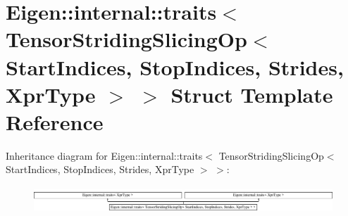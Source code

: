 \hypertarget{struct_eigen_1_1internal_1_1traits_3_01_tensor_striding_slicing_op_3_01_start_indices_00_01_stop9ad1ed36f680305576abbd4a33c38a6e}{}\section{Eigen\+:\+:internal\+:\+:traits$<$ Tensor\+Striding\+Slicing\+Op$<$ Start\+Indices, Stop\+Indices, Strides, Xpr\+Type $>$ $>$ Struct Template Reference}
\label{struct_eigen_1_1internal_1_1traits_3_01_tensor_striding_slicing_op_3_01_start_indices_00_01_stop9ad1ed36f680305576abbd4a33c38a6e}
Inheritance diagram for Eigen\+:\+:internal\+:\+:traits$<$ Tensor\+Striding\+Slicing\+Op$<$ Start\+Indices, Stop\+Indices, Strides, Xpr\+Type $>$ $>$\+:\begin{figure}[H]
\begin{center}
\leavevmode
\includegraphics[height=0.992908cm]{struct_eigen_1_1internal_1_1traits_3_01_tensor_striding_slicing_op_3_01_start_indices_00_01_stop9ad1ed36f680305576abbd4a33c38a6e}
\end{center}
\end{figure}
